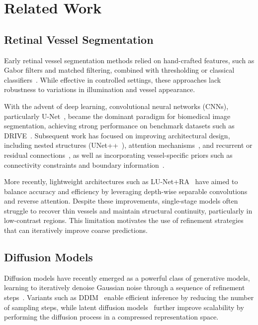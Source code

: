 \documentclass[journal,article,submit,pdftex,moreauthors]{Definitions/mdpi}
\begin{document}
\section{Related Work}
\label{sec:related}

\subsection{Retinal Vessel Segmentation}

Early retinal vessel segmentation methods relied on hand-crafted features, such as Gabor filters and matched filtering, combined with thresholding or classical classifiers~\cite{Soares2006, Mendonca2006}. While effective in controlled settings, these approaches lack robustness to variations in illumination and vessel appearance.

With the advent of deep learning, convolutional neural networks (CNNs), particularly U-Net~\cite{Ronneberger2015}, became the dominant paradigm for biomedical image segmentation, achieving strong performance on benchmark datasets such as DRIVE~\cite{Staal2004}. Subsequent work has focused on improving architectural design, including nested structures (UNet++~\cite{Zhou2018UNetpp}), attention mechanisms~\cite{Oktay2018AttUNet, Schlemper2019AG}, and recurrent or residual connections~\cite{Alom2018R2UNet}, as well as incorporating vessel-specific priors such as connectivity constraints and boundary information~\cite{Fu2016DeepVessel, Liskowski2016, Shin2019Connectivity}.

More recently, lightweight architectures such as LU-Net+RA~\cite{Hernandez2025} have aimed to balance accuracy and efficiency by leveraging depth-wise separable convolutions and reverse attention. Despite these improvements, single-stage models often struggle to recover thin vessels and maintain structural continuity, particularly in low-contrast regions. This limitation motivates the use of refinement strategies that can iteratively improve coarse predictions.

\subsection{Diffusion Models}

Diffusion models have recently emerged as a powerful class of generative models, learning to iteratively denoise Gaussian noise through a sequence of refinement steps~\cite{Ho2020}. Variants such as DDIM~\cite{Song2021} enable efficient inference by reducing the number of sampling steps, while latent diffusion models~\cite{Rombach2022} further improve scalability by performing the diffusion process in a compressed representation space.
\end{document}
